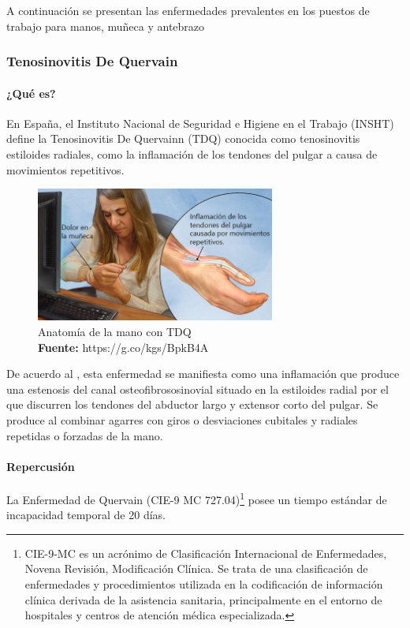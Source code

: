  A continuación se presentan las enfermedades prevalentes en los puestos de trabajo para manos, muñeca y antebrazo

\subsubsection{Tenosinovitis De Quervain}
\paragraph{¿Qué es?}
En España, el Instituto Nacional de Seguridad e Higiene en el Trabajo (INSHT) define la Tenosinovitis De Quervainn (TDQ) conocida como tenosinovitis estiloides radiales, como la inflamación de los tendones del pulgar a causa de movimientos repetitivos. \parencite[1]{INSHT2017TendinitisPulgar}

\begin{figure}[H]
    \centering
    \includegraphics[width=0.7\textwidth]{Anexos/LATEX/chapters/images/TDQ.jpg}
    \caption{Anatomía de la mano con TDQ \\\textbf{Fuente:} https://g.co/kgs/BpkB4A}
    \label{TDQ}
\end{figure}

De acuerdo al \parencite[2]{INSHT2017TendinitisPulgar}, esta enfermedad se manifiesta como una inflamación que produce una estenosis del canal osteofibrososinovial situado en la estiloides radial por el que discurren los tendones del abductor largo y extensor corto del pulgar. Se produce al combinar agarres con giros o desviaciones cubitales y radiales repetidas o forzadas de la mano.
\paragraph{Repercusión}
La Enfermedad de Quervain (CIE-9 MC 727.04)\footnote{CIE-9-MC es un acrónimo de Clasificación Internacional de Enfermedades, Novena Revisión, Modificación Clínica. Se trata de una clasificación de enfermedades y procedimientos utilizada en la codificación de información clínica derivada de la asistencia sanitaria, principalmente en el entorno de hospitales y centros de atención médica especializada.} posee un tiempo estándar de incapacidad temporal de 20 días.\parencite[6]{INSHT2017TendinitisPulgar}
